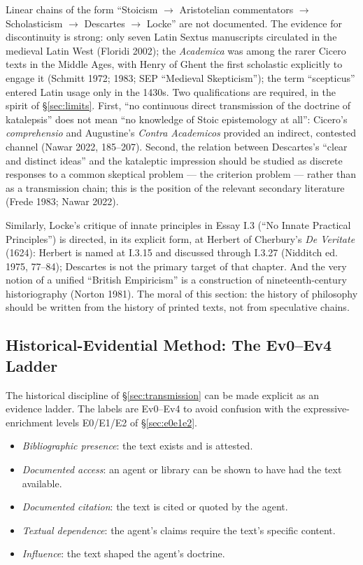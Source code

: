 \documentclass[11pt]{article}
\theoremstyle{plain}
\theoremstyle{definition}
\theoremstyle{remark}
\begin{document}
Linear chains of the form ``Stoicism $\to$ Aristotelian commentators
$\to$ Scholasticism $\to$ Descartes $\to$ Locke'' are not documented.
The evidence for discontinuity is strong: only seven Latin Sextus
manuscripts circulated in the medieval Latin West (Floridi 2002); the
\emph{Academica} was among the rarer Cicero texts in the Middle Ages,
with Henry of Ghent the first scholastic explicitly to engage it
(Schmitt 1972; 1983; SEP ``Medieval Skepticism''); the term
``scepticus'' entered Latin usage only in the 1430s. Two qualifications
are required, in the spirit of \S\ref{sec:limits}. First, ``no
continuous direct transmission of the doctrine of katalepsis'' does not
mean ``no knowledge of Stoic epistemology at all'': Cicero's
\emph{comprehensio} and Augustine's \emph{Contra Academicos} provided
an indirect, contested channel (Nawar 2022, 185--207). Second, the
relation between Descartes's ``clear and distinct ideas'' and the
kataleptic impression should be studied as discrete responses to a
common skeptical problem --- the criterion problem --- rather than as a
transmission chain; this is the position of the relevant secondary
literature (Frede 1983; Nawar 2022).

Similarly, Locke's critique of innate principles in Essay I.3 (``No
Innate Practical Principles'') is directed, in its explicit form, at
Herbert of Cherbury's \emph{De Veritate} (1624): Herbert is named at
I.3.15 and discussed through I.3.27 (Nidditch ed. 1975, 77--84); Descartes is not
the primary target of that chapter. And the very notion of a unified
``British Empiricism'' is a construction of nineteenth-century
historiography (Norton 1981). The moral of this section: the history
of philosophy should be written from the history of printed texts, not
from speculative chains.

\subsection{Historical-Evidential Method: The Ev0--Ev4 Ladder}
\label{sec:ev-ladder}

The historical discipline of \S\ref{sec:transmission} can be made
explicit as an evidence ladder. The labels are Ev0--Ev4 to avoid
confusion with the expressive-enrichment levels E0/E1/E2 of
\S\ref{sec:e0e1e2}.

\begin{itemize}
\item[Ev0] \emph{Bibliographic presence}: the text exists and is
attested.
\item[Ev1] \emph{Documented access}: an agent or library can be shown
to have had the text available.
\item[Ev2] \emph{Documented citation}: the text is cited or quoted by
the agent.
\item[Ev3] \emph{Textual dependence}: the agent's claims require the
text's specific content.
\item[Ev4] \emph{Influence}: the text shaped the agent's doctrine.
\end{itemize}
\end{document}
